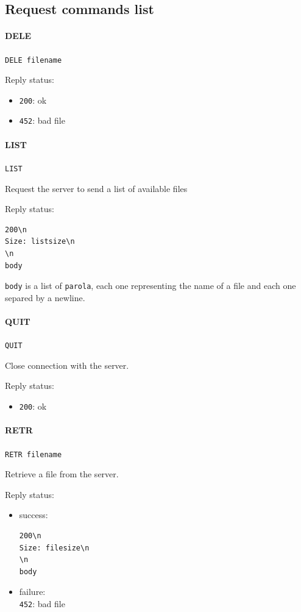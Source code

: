 \documentclass[a4paper,12pt]{article}
\begin{document}
\subsection{Request commands list}

\paragraph{DELE}
\texttt{DELE filename}

Reply status:
\begin{itemize}
  \item \texttt{200}: ok
  \item \texttt{452}: bad file
\end{itemize}

\paragraph{LIST}
\texttt{LIST}

Request the server to send a list of available files

Reply status:
\begin{verbatim}
200\n
Size: listsize\n
\n
body
\end{verbatim}

\texttt{body} is a list of \texttt{parola}, each one representing the name of a file and each one separed by a newline.

\paragraph{QUIT}
\texttt{QUIT}

Close connection with the server.

Reply status:
\begin{itemize}
  \item \texttt{200}: ok
\end{itemize}

\paragraph{RETR}
\texttt{RETR filename}

Retrieve a file from the server.

Reply status:
\begin{itemize}
  \item success:
\begin{verbatim}
200\n
Size: filesize\n
\n
body
\end{verbatim}
  \item failure:\\
  \texttt{452}: bad file
\end{itemize}
\end{document}

